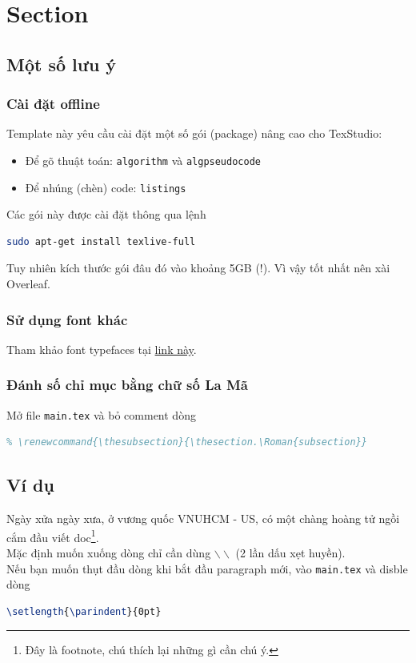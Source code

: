 \section{Section}

\subsection{Một số lưu ý}

\subsubsection{Cài đặt offline}
Template này yêu cầu cài đặt một số gói (package) nâng cao cho TexStudio:
\begin{itemize}
\item Để gõ thuật toán: \texttt{algorithm} và \texttt{algpseudocode}
\item Để nhúng (chèn) code: \texttt{listings}
\end{itemize}
Các gói này được cài đặt thông qua lệnh
\begin{lstlisting}[language=sh]
sudo apt-get install texlive-full
\end{lstlisting}
Tuy nhiên kích thước gói đâu đó vào khoảng 5GB (!). Vì vậy tốt nhất nên xài Overleaf.

\subsubsection{Sử dụng font khác}
Tham khảo font typefaces tại \href{https://www.overleaf.com/learn/latex/Font_typefaces}{link này}.

\subsubsection{Đánh số chỉ mục bằng chữ số La Mã}
Mở file \texttt{main.tex} và bỏ comment dòng 
\begin{lstlisting}[language=tex]
% \renewcommand{\thesection}{\Roman{section}}
% \renewcommand{\thesubsection}{\thesection.\Roman{subsection}}  
\end{lstlisting}

\subsection{Ví dụ}
Ngày xửa ngày xưa, ở vương quốc VNUHCM - US, có một chàng hoàng tử ngồi cắm đầu viết doc\footnote{Đây là footnote, chú thích lại những gì cần chú ý.}.\\
Mặc định muốn xuống dòng chỉ cần dùng $\backslash\backslash$  (2 lần dấu xẹt huyền).\\
Nếu bạn muốn thụt đầu dòng khi bắt đầu paragraph mới, vào \texttt{main.tex} và disble dòng
\begin{lstlisting}[language=tex]
\setlength{\parindent}{0pt}
\end{lstlisting}

